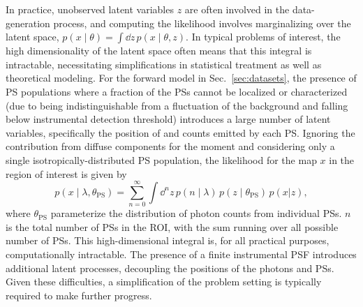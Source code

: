 \documentclass[prd,aps,10pt,nofootinbib,twocolumn,superscriptaddress,preprintnumbers,balancelastpage,longbibliography]{revtex4-1}
\begin{document}
In practice, unobserved latent variables $z$ are often involved in the data-generation process, and computing the likelihood involves marginalizing over the latent space, $p(x\mid\theta) = \int \dd z\,p(x\mid\theta, z)$. In typical problems of interest, the high dimensionality of the latent space often means that this integral is intractable, necessitating simplifications in statistical treatment as well as theoretical modeling. 
For the forward model in Sec.~\ref{sec:datasets}, the presence of PS populations where a fraction of the PSs cannot be localized or characterized (due to being indistinguishable from a fluctuation of the background and falling below instrumental detection threshold) introduces a large number of latent variables, specifically the position of and counts emitted by each PS. Ignoring the contribution from diffuse components for the moment and considering only a single isotropically-distributed PS population, the likelihood for the map $x$ in the region of interest is given by
\begin{equation}
\label{eq:data_likelihood}
p(x\mid\lambda, \theta_\mathrm{PS}) = \sum_{n = 0}^{\infty} \int \dd^{n} z \, p\left(n\mid\lambda\right)\,p(z\mid\theta_\mathrm{PS})\,p(x|z),
\end{equation}
where $\theta_\mathrm{PS}$ parameterize the distribution of photon counts from individual PSs. $n$ is the total number of PSs in the ROI, with the sum running over all possible number of PSs. This high-dimensional integral is, for all practical purposes, computationally intractable. The presence of a finite instrumental PSF introduces additional latent processes, decoupling the positions of the photons and PSs. Given these difficulties, a simplification of the problem setting is typically required to make further progress.
\end{document}
